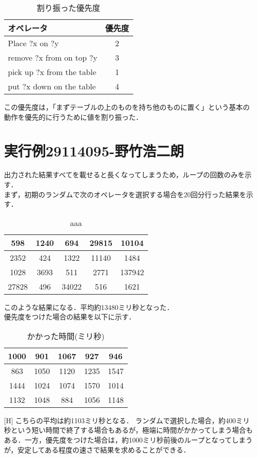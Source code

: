 \documentclass{jarticle}
\begin{document}
\begin{table}[H]
\caption{割り振った優先度}
\begin{center}
\begin{tabular}{|l|c|}
\hline
オペレータ & 優先度 \\ \hline
Place ?x on ?y & 2 \\ \hline
remove ?x from on top ?y & 3 \\ \hline
pick up ?x from the table & 1 \\ \hline
put ?x down on the table & 4 \\ \hline
\end{tabular}
\end{center}
\end{table}
この優先度は，「まずテーブルの上のものを持ち他のものに置く」という基本の動作を優先的に行うために値を割り振った．
\section{実行例29114095-野竹浩二朗}
出力された結果すべてを載せると長くなってしまうため，ループの回数のみを示す．\\
まず，初期のランダムで次のオペレータを選択する場合を20回分行った結果を示す．\\
\begin{table}[H]
\caption{aaa}
\begin{center}
\begin{tabular}{|c|c|c|c|c|}
\hline
598  & 1240  & 694    & 29815 & 10104   \\ \hline
2352   & 424  & 1322    & 11140  & 1484   \\ \hline
1028   & 3693  & 511  & 2771 & 137942  \\ \hline
27828   & 496 & 34022   & 516  & 1621 \\ \hline
\end{tabular}
\end{center}
\end{table}
このような結果になる．平均約13480ミリ秒となった．\\
優先度をつけた場合の結果を以下に示す．
\begin{table}
\caption{かかった時間(ミリ秒)}
\begin{center}
\begin{tabular}{|c|c|c|c|c|}
\hline
1000  & 901  & 1067 & 927 & 946   \\ \hline
863  & 1050  & 1120 & 1235 & 1547 \\ \hline
1444   & 1024 & 1074 & 1570 & 1014  \\ \hline
1132   & 1048 & 884  & 1056  & 1148 \\ \hline
\end{tabular}
\end{center}
\end{table}[H]
こちらの平均は約1103ミリ秒となる．
ランダムで選択した場合，約400ミリ秒という短い時間で終了する場合もあるが，極端に時間がかかってしまう場合もある．一方，優先度をつけた場合は，約1000ミリ秒前後のループとなってしまうが，安定してある程度の速さで結果を求めることができる．
\end{document}
